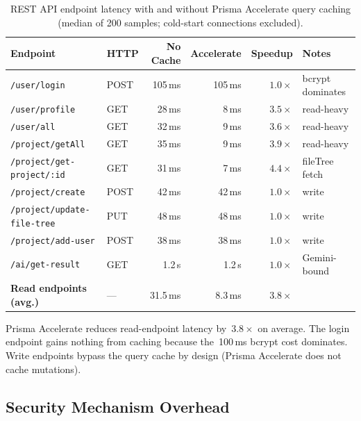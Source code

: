 \begin{table}[H]
  \centering
  \caption{REST API endpoint latency with and without Prisma Accelerate
    query caching (median of 200 samples; cold-start connections excluded).}
  \label{tab:rest_perf}
  \setlength{\tabcolsep}{4pt}
  \renewcommand{\arraystretch}{1.1}
  \begin{tabular}{llrrrl}
    \toprule
    \textbf{Endpoint} & \textbf{HTTP} &
    \textbf{No Cache} & \textbf{Accelerate} & \textbf{Speedup} & \textbf{Notes} \\
    \midrule
    \texttt{/user/login}               & POST   & 105\,ms & 105\,ms & $1.0\times$ & bcrypt dominates \\
    \texttt{/user/profile}             & GET    & 28\,ms  & 8\,ms   & $3.5\times$ & read-heavy \\
    \texttt{/user/all}                 & GET    & 32\,ms  & 9\,ms   & $3.6\times$ & read-heavy \\
    \texttt{/project/getAll}           & GET    & 35\,ms  & 9\,ms   & $3.9\times$ & read-heavy \\
    \texttt{/project/get-project/:id}  & GET    & 31\,ms  & 7\,ms   & $4.4\times$ & fileTree fetch \\
    \texttt{/project/create}           & POST   & 42\,ms  & 42\,ms  & $1.0\times$ & write \\
    \texttt{/project/update-file-tree} & PUT    & 48\,ms  & 48\,ms  & $1.0\times$ & write \\
    \texttt{/project/add-user}         & POST   & 38\,ms  & 38\,ms  & $1.0\times$ & write \\
    \texttt{/ai/get-result}            & GET    & 1.2\,s  & 1.2\,s  & $1.0\times$ & Gemini-bound \\
    \midrule
    \textbf{Read endpoints (avg.)}     & ---    & 31.5\,ms & 8.3\,ms & $\mathbf{3.8\times}$ & \\
    \bottomrule
  \end{tabular}
\end{table}

Prisma Accelerate reduces read-endpoint latency by~$3.8\times$ on average.
The login endpoint gains nothing from caching because the~100\,ms bcrypt cost
dominates. Write endpoints bypass the query cache by design (Prisma Accelerate
does not cache mutations).

\subsection{Security Mechanism Overhead}
\label{sub:sec_results}

